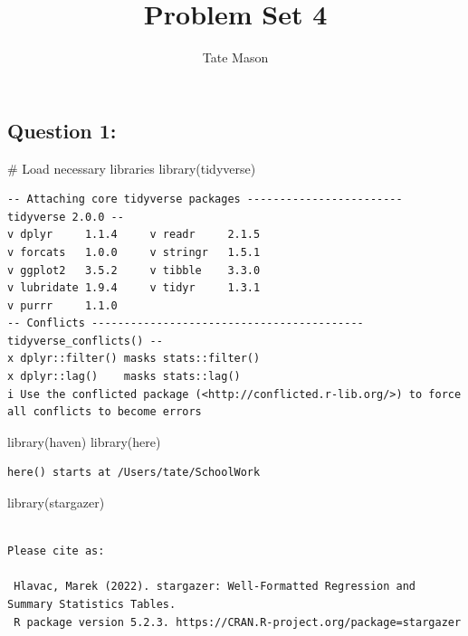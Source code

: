\documentclass[
  letterpaper,
  DIV=11,
  numbers=noendperiod]{scrartcl}
\title{Problem Set 4}
\author{Tate Mason}
\date{}
\newenvironment{Shaded}{\begin{snugshade}}{\end{snugshade}}
\newcommand{\CommentTok}[1]{\textcolor[rgb]{0.37,0.37,0.37}{#1}}
\newcommand{\FunctionTok}[1]{\textcolor[rgb]{0.28,0.35,0.67}{#1}}
\newcommand{\NormalTok}[1]{\textcolor[rgb]{0.00,0.23,0.31}{#1}}
\begin{document}
\maketitle


\subsection{Question 1:}\label{question-1}

\begin{Shaded}
\begin{Highlighting}[]
\CommentTok{\# Load necessary libraries}
\FunctionTok{library}\NormalTok{(tidyverse)}
\end{Highlighting}
\end{Shaded}

\begin{verbatim}
-- Attaching core tidyverse packages ------------------------ tidyverse 2.0.0 --
v dplyr     1.1.4     v readr     2.1.5
v forcats   1.0.0     v stringr   1.5.1
v ggplot2   3.5.2     v tibble    3.3.0
v lubridate 1.9.4     v tidyr     1.3.1
v purrr     1.1.0     
-- Conflicts ------------------------------------------ tidyverse_conflicts() --
x dplyr::filter() masks stats::filter()
x dplyr::lag()    masks stats::lag()
i Use the conflicted package (<http://conflicted.r-lib.org/>) to force all conflicts to become errors
\end{verbatim}

\begin{Shaded}
\begin{Highlighting}[]
\FunctionTok{library}\NormalTok{(haven)}
\FunctionTok{library}\NormalTok{(here)}
\end{Highlighting}
\end{Shaded}

\begin{verbatim}
here() starts at /Users/tate/SchoolWork
\end{verbatim}

\begin{Shaded}
\begin{Highlighting}[]
\FunctionTok{library}\NormalTok{(stargazer)}
\end{Highlighting}
\end{Shaded}

\begin{verbatim}

Please cite as: 

 Hlavac, Marek (2022). stargazer: Well-Formatted Regression and Summary Statistics Tables.
 R package version 5.2.3. https://CRAN.R-project.org/package=stargazer 
\end{verbatim}
\end{document}
